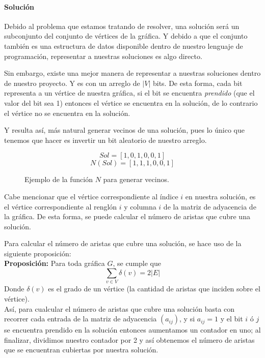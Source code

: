 \documentclass{article}
\newcommand{\tbf}[1]{\textbf{#1}}
\newcommand{\tit}[1]{\textit{#1}}
\begin{document}
  \paragraph{Solución}

  Debido al problema que estamos tratando de resolver, una solución será 
  un subconjunto del conjunto de vértices de la gráfica. Y debido a que el 
  conjunto también es una estructura de datos disponible dentro de nuestro 
  lenguaje de programación, representar a nuestras soluciones es algo directo.
  
  Sin embargo, existe una mejor manera de representar a nuestras soluciones 
  dentro de nuestro proyecto. Y es con un arreglo de $|V|$ bits. De esta forma,
  cada bit representa a un vértice de nuestra gráfica, si el bit se encuentra
  \tit{prendido} (que el valor del bit sea 1) entonces el vértice se encuentra 
  en la solución, de lo contrario el vértice no se encuentra en la solución.

  Y resulta así, más natural generar vecinos de una solución, pues lo único que 
  tenemos que hacer es invertir un bit aleatorio de nuestro arreglo.

  \begin{figure}[H]
    \[ Sol    = [1, 0, 1, 0, 0, 1] \]
    \[ N(Sol) = [1, 1, 1, 0, 0, 1] \]
    \caption{Ejemplo de la función $N$ para generar vecinos.}
  \end{figure}

  Cabe mencionar que el vértice correspondiente al índice $i$ en nuestra 
  solución, es el vértice correspondiente al renglón $i$ y columna $i$ 
  de la matriz de adyacencia de la gráfica. De esta forma, se puede 
  calcular el número de aristas que cubre una solución.

  Para calcular el número de aristas que cubre una solución, se hace uso
  de la siguiente proposición: \\

  \tbf{Proposición:} Para toda gráfica $G$, se cumple que
  \[ \sum_{v \in V} \delta(v) = 2|E| \]
  Donde $\delta(v)$ es el grado de un vértice (la cantidad de 
  aristas que inciden sobre el vértice). \\

  Así, para cualcular el número de aristas que cubre una solución basta con 
  recorrer cada entrada de la matriz de adyacencia $(a_{ij})$, y si 
  $a_{ij} = 1$ y el bit $i$ ó $j$ se encuentra prendido en la solución entonces 
  aumentamos un contador en uno; al finalizar, dividimos nuestro contador 
  por 2 y así obtenemos el número de aristas que se encuentran cubiertas 
  por nuestra solución.
\end{document}
